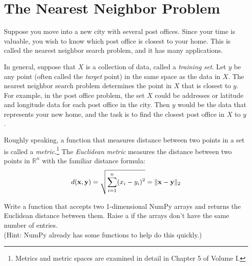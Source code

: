 

\section*{The Nearest Neighbor Problem} %

Suppose you move into a new city with several post offices.
Since your time is valuable, you wish to know which post office is closest to your home.
This is called the nearest neighbor search problem, and it has many applications.

In general, suppose that $X$ is a collection of data, called a \emph{training set}.
Let $y$ be any point (often called the \emph{target} point) in the same space as the data in $X$.
The nearest neighbor search problem determines the point in $X$ that is closest to $y$.
For example, in the post office problem, the set $X$ could be addresses or latitude and longitude data for each post office in the city.
Then $y$ would be the data that represents your new home, and the task is to find the closest post office in $X$ to $y$.

\begin{problem} %
Roughly speaking, a function that measures distance between two points in a set is called a \emph{metric}.\footnote{Metrics and metric spaces are examined in detail in Chapter 5 of Volume I.}
The \emph{Euclidean metric} measures the distance between two points in $\mathbb{R}^n$ with the familiar distance formula:
\[
d(\mathbf{x},\mathbf{y}) = \sqrt{\displaystyle\sum_{i=1}^n (x_i - y_i)^2} = \| \mathbf{x} - \mathbf{y} \|_2
\]

Write a function that accepts two 1-dimensional NumPy arrays and returns the Euclidean distance between them.
Raise a  if the arrays don't have the same number of entries.
\\
(Hint: NumPy already has some functions to help do this quickly.)
\end{problem}

